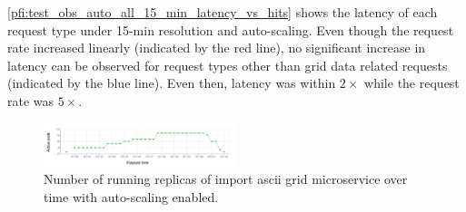 \documentclass[conference]{IEEEtran}
\begin{document}
\cref{pfi:test_obs_auto_all_15_min_latency_vs_hits} shows the latency of each request type under 15-min resolution and auto-scaling. Even though the request rate increased linearly (indicated by the red line), no significant increase in latency can be observed for request types other than grid data related requests (indicated by the blue line). Even then, latency was within $2\times$ while the request rate was $5\times$.



\begin{figure}[!tb]
    \centering
    \includegraphics[width=0.5\textwidth]{images/obs_all_auto_15m_import_ascii_pods_p1.pdf}
    \caption{Number of running replicas of import ascii grid microservice over time with auto-scaling enabled.}
    \label{pfi:obs_all_auto_15m_import_grid_pod}
\end{figure}
\end{document}

